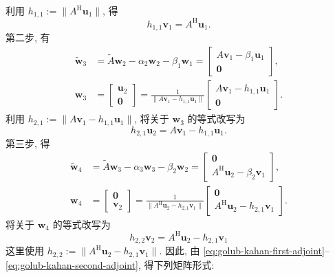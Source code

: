 {利用 $h_{1,1}:=\|A^{\mathrm H}\bm u_1\|$, 得}
\begin{equation}\label{eq:golub-kahan-first-adjoint}h_{1,1}\bm v_1=A^{\mathrm H}\bm u_1.\end{equation}
{第二步, 有}
\[\begin{aligned}\widetilde{\bm w}_3&=\widetilde A\bm w_2-\alpha_2\bm w_2-\beta_1\bm w_1=\begin{bmatrix}A\bm v_1-\beta_1\bm u_1\\\bm0\end{bmatrix},\\
\bm w_3&=\begin{bmatrix}\bm u_2\\\bm0\end{bmatrix}=\frac1{\|A\bm v_1-h_{1,1}\bm u_1\|}\begin{bmatrix}A\bm v_1-h_{1,1}\bm u_1\\\bm0\end{bmatrix}.\end{aligned}\]
{利用 $h_{2,1}:=\|A\bm v_1-h_{1,1}\bm u_1\|$, 将关于 $\bm w_3$ 的等式改写为}
\begin{equation}\label{eq:golub-kahan-first-forward}h_{2,1}\bm u_2=A\bm v_1-h_{1,1}\bm u_1.\end{equation}
{第三步, 得}
\[\begin{aligned}\widetilde{\bm w}_4&=\widetilde A\bm w_3-\alpha_3\bm w_3-\beta_2\bm w_2=\begin{bmatrix}\bm0\\A^{\mathrm H}\bm u_2-\beta_2\bm v_1\end{bmatrix},\\
\bm w_4&=\begin{bmatrix}\bm0\\\bm v_2\end{bmatrix}=\frac1{\|A^{\mathrm H}\bm u_2-h_{2,1}\bm v_1\|}\begin{bmatrix}\bm0\\A^{\mathrm H}\bm u_2-h_{2,1}\bm v_1\end{bmatrix}.\end{aligned}\]
{将关于 $\bm w_4$ 的等式改写为}
\begin{equation}\label{eq:golub-kahan-second-adjoint}h_{2,2}\bm v_2=A^{\mathrm H}\bm u_2-h_{2,1}\bm v_1\end{equation}
{这里使用 $h_{2,2}:=\|A^{\mathrm H}\bm u_2-h_{2,1}\bm v_1\|$. 因此, 由 \eqref{eq:golub-kahan-first-adjoint}--\eqref{eq:golub-kahan-second-adjoint}, 得下列矩阵形式:}

